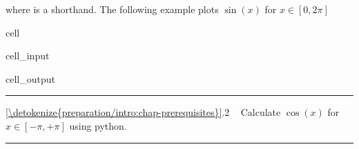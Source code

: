\documentclass[letterpaper,10pt,english]{jupyterBook}
\begin{document}
\sphinxAtStartPar
where  is a shorthand.
The following example plots \(\sin(x)\) for \(x \in [0,2\pi]\)

\begin{sphinxuseclass}{cell}\begin{sphinxVerbatimInput}

\begin{sphinxuseclass}{cell_input}
\begin{sphinxVerbatim}[commandchars=\\\{\}]
      
     
  
\end{sphinxVerbatim}

\end{sphinxuseclass}\end{sphinxVerbatimInput}
\begin{sphinxVerbatimOutput}

\begin{sphinxuseclass}{cell_output}
\begin{sphinxVerbatim}
\end{sphinxVerbatim}

\noindent{}

\end{sphinxuseclass}\end{sphinxVerbatimOutput}

\end{sphinxuseclass}

\bigskip\hrule\bigskip


\sphinxAtStartPar
{} \hyperref[\detokenize{preparation/intro:chap-prerequisites}]{\ref{\detokenize{preparation/intro:chap-prerequisites}}}.2   Calculate \(\cos(x)\) for \(x \in [-\pi,+\pi]\) using python.


\bigskip\hrule\bigskip
\end{document}
